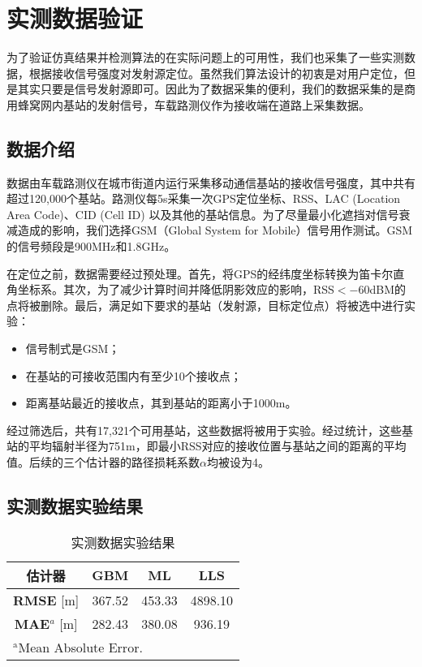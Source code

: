 \section{实测数据验证}

为了验证仿真结果并检测算法的在实际问题上的可用性，我们也采集了一些实测数据，根据接收信号强度对发射源定位。虽然我们算法设计的初衷是对用户定位，但是其实只要是信号发射源即可。因此为了数据采集的便利，我们的数据采集的是商用蜂窝网内基站的发射信号，车载路测仪作为接收端在道路上采集数据。

\subsection{数据介绍}

数据由车载路测仪在城市街道内运行采集移动通信基站的接收信号强度，其中共有超过120,000个基站。路测仪每5s采集一次GPS定位坐标、RSS、LAC (Location Area Code)、CID (Cell ID) 以及其他的基站信息。为了尽量最小化遮挡对信号衰减造成的影响，我们选择GSM（Global System for Mobile）信号用作测试。GSM的信号频段是900MHz和1.8GHz。

在定位之前，数据需要经过预处理。首先，将GPS的经纬度坐标转换为笛卡尔直角坐标系。其次，为了减少计算时间并降低阴影效应的影响，RSS$<-60$dBM的点将被删除。最后，满足如下要求的基站（发射源，目标定位点）将被选中进行实验：
\begin{itemize}
	\item 信号制式是GSM；
	\item 在基站的可接收范围内有至少10个接收点；
	\item 距离基站最近的接收点，其到基站的距离小于1000m。
\end{itemize}

经过筛选后，共有17,321个可用基站，这些数据将被用于实验。经过统计，这些基站的平均辐射半径为751m，即最小RSS对应的接收位置与基站之间的距离的平均值。后续的三个估计器的路径损耗系数$\alpha$均被设为4。

\subsection{实测数据实验结果}

\begin{table}[tbp]
	\caption{实测数据实验结果}
	\begin{center}
		\begin{tabular}{cccc}
			\toprule
			\textbf{估计器} & \textbf{GBM} & \textbf{ML} & \textbf{LLS} \\
			\midrule
			\textbf{RMSE} [m] & 367.52 & 453.33 & 4898.10 \\
			\midrule
			\textbf{MAE}$^{a}$ [m] & 282.43 & 380.08 & 936.19 \\
			\bottomrule
			\multicolumn{3}{l}{$^{\mathrm{a}}$Mean Absolute Error.}
		\end{tabular}
		\label{tab:transmitter}
	\end{center}
\end{table}

